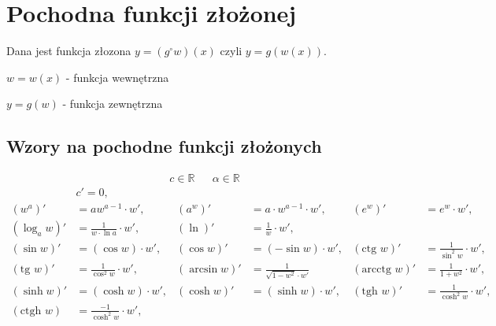 \documentclass[11pt]{article}
\begin{document}
\section{Pochodna funkcji złożonej}
\label{sec:orgca5629e}
Dana jest funkcja złozona \(y = (g^\circ w)(x)\) czyli \(y = g(w(x))\).

\(w = w(x)\) - funkcja wewnętrzna

\(y = g(w)\) - funkcja zewnętrzna
\subsection{Wzory na pochodne funkcji złożonych}
\label{sec:org949e727}
\begin{align*}
c \in \mathbb{R} && \alpha \in \mathbb{R}
\end{align*}
\begin{align*}
  & c' = 0,
  \\ \left(w^{a}\right)'&= a w^{a-1} \cdot w',
                        & \left(a^{w} \right)' &= a  \cdot w^{a-1} \cdot w',
                                               & \left( e^{w} \right)' &= e^{w} \cdot w',
  \\ \left(\log_{a}w \right)' &= \frac{1}{w \cdot \ln a} \cdot w',
                        & \left( \ln \right)' &= \frac{1}{w} \cdot w',
  \\ \left( \sin w \right)' &= (\cos w) \cdot w',
                        & \left( \cos w \right)' &= (- \sin w) \cdot w',
                                               & \left(\text{ctg } w \right)' &= \frac{1}{\sin^{2} w} \cdot w',
  \\ \left( \text{tg } w \right)' &= \frac{1}{\cos^{2} w} \cdot w' ,
                        & \left( \arcsin w \right)' &= \frac{1}{\sqrt{1-w^{2}} \cdot w'}
                                               & \left( \text{arcctg } w \right)' &= \frac{1}{1+w^{2}} \cdot w',
  \\ \left( \sinh w \right )' &=  (\cosh w) \cdot w' ,
                        & \left( \cosh w \right )' &= (\sinh w) \cdot w',
                                               & \left( \text{tgh } w \right )' &= \frac{1}{\cosh^{2} w} \cdot w',
  \\ \left( \text{ctgh } w \right ) &= \frac{-1}{\cosh ^{2} w} \cdot w',
\end{align*}
\end{document}
